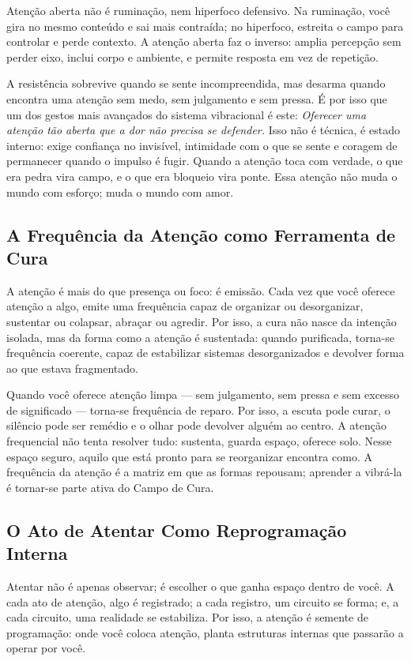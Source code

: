 \documentclass[12pt]{book}
\begin{document}
Atenção aberta não é ruminação, nem hiperfoco defensivo. Na ruminação, você gira no mesmo conteúdo e sai mais contraída; no hiperfoco, estreita o campo para controlar e perde contexto. A atenção aberta faz o inverso: amplia percepção sem perder eixo, inclui corpo e ambiente, e permite resposta em vez de repetição.

A resistência sobrevive quando se sente incompreendida, mas desarma quando encontra uma atenção sem medo, sem julgamento e sem pressa. É por isso que um dos gestos mais avançados do sistema vibracional é este: \textit{Oferecer uma atenção tão aberta que a dor não precisa se defender.} Isso não é técnica, é estado interno: exige confiança no invisível, intimidade com o que se sente e coragem de permanecer quando o impulso é fugir. Quando a atenção toca com verdade, o que era pedra vira campo, e o que era bloqueio vira ponte. Essa atenção não muda o mundo com esforço; muda o mundo com amor.

\subsection*{A Frequência da Atenção como Ferramenta de Cura}

A atenção é mais do que presença ou foco: é emissão. Cada vez que você oferece atenção a algo, emite uma frequência capaz de organizar ou desorganizar, sustentar ou colapsar, abraçar ou agredir. Por isso, a cura não nasce da intenção isolada, mas da forma como a atenção é sustentada: quando purificada, torna-se frequência coerente, capaz de estabilizar sistemas desorganizados e devolver forma ao que estava fragmentado.

Quando você oferece atenção limpa — sem julgamento, sem pressa e sem excesso de significado — torna-se frequência de reparo. Por isso, a escuta pode curar, o silêncio pode ser remédio e o olhar pode devolver alguém ao centro. A atenção frequencial não tenta resolver tudo: sustenta, guarda espaço, oferece solo. Nesse espaço seguro, aquilo que está pronto para se reorganizar encontra como. A frequência da atenção é a matriz em que as formas repousam; aprender a vibrá-la é tornar-se parte ativa do Campo de Cura.

\subsection*{O Ato de Atentar Como Reprogramação Interna}

Atentar não é apenas observar; é escolher o que ganha espaço dentro de você. A cada ato de atenção, algo é registrado; a cada registro, um circuito se forma; e, a cada circuito, uma realidade se estabiliza. Por isso, a atenção é semente de programação: onde você coloca atenção, planta estruturas internas que passarão a operar por você.
\end{document}
